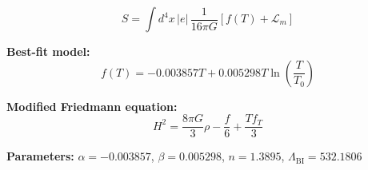 
\begin{equation}
  S = \int d^4x \, |e| \, \frac{1}{16\pi G} \left[ f(T) + \mathcal{L}_m \right]
\end{equation}

\textbf{Best-fit model:}
\begin{equation}
  f(T) = -0.003857 T + 0.005298 T \ln\!\left(\frac{T}{T_0}\right)
\end{equation}

\textbf{Modified Friedmann equation:}
\begin{equation}
  H^2 = \frac{8\pi G}{3} \rho - \frac{f}{6} + \frac{T f_T}{3}
\end{equation}

\textbf{Parameters:}
$\alpha = -0.003857$, \quad
$\beta = 0.005298$, \quad
$n = 1.3895$, \quad
$\Lambda_{\text{BI}} = 532.1806$